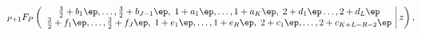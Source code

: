 \begin{equation}
\hspace*{-3mm}
_{P+1}F_P\left(\begin{array}{c|}
\tfrac{3}{2} + b_1 \ep,\ldots, \tfrac{3}{2} + b_{J-1} \ep, \; 
1+a_1\ep, \ldots, 1+a_K \ep, \; 2+d_1 \ep \ldots, 2+d_L \ep \\
\tfrac{3}{2} + f_1 \ep, \ldots, \tfrac{3}{2} + f_J \ep, \; 
1+e_1\ep, \ldots, 1+e_{R}\ep, \; 
2+c_1\ep, \ldots, 2+c_{K+L-R-2} \ep
\end{array} ~z \right),
\label{PFQ}
\end{equation}


